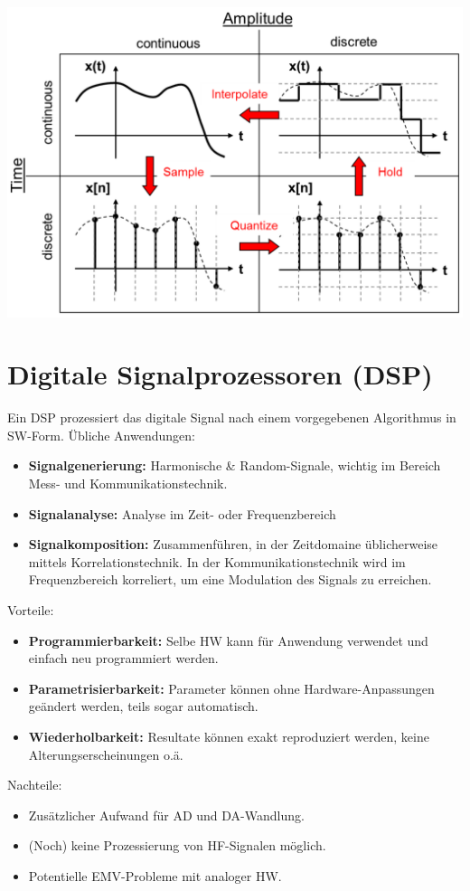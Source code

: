 \begin{center}
	\includegraphics[scale=.85]{../fig/ad_da}
\end{center}
\section{Digitale Signalprozessoren (DSP)}
Ein DSP prozessiert das digitale Signal nach einem vorgegebenen Algorithmus in SW-Form. Übliche Anwendungen:
\begin{itemize}[itemsep=-5pt,topsep=3pt]
	\item \textbf{Signalgenerierung:} Harmonische \& Random-Signale, wichtig im Bereich Mess- und Kommunikationstechnik.
	\item \textbf{Signalanalyse:} Analyse im Zeit- oder Frequenzbereich
	\item \textbf{Signalkomposition:} Zusammenführen, in der Zeitdomaine üblicherweise mittels Korrelationstechnik. In der Kommunikationstechnik wird im Frequenzbereich korreliert, um eine Modulation des Signals zu erreichen. 
\end{itemize}
Vorteile:
\begin{itemize}[itemsep=-5pt,topsep=3pt]
	\item \textbf{Programmierbarkeit:} Selbe HW kann für Anwendung verwendet und einfach neu programmiert werden.
	\item \textbf{Parametrisierbarkeit:} Parameter können ohne Hardware-Anpassungen geändert werden, teils sogar automatisch.
	\item \textbf{Wiederholbarkeit:} Resultate können exakt reproduziert werden, keine Alterungserscheinungen o.ä.
\end{itemize}
Nachteile:
\begin{itemize}[itemsep=-5pt,topsep=3pt]
	\item Zusätzlicher Aufwand für AD und DA-Wandlung.
	\item (Noch) keine Prozessierung von HF-Signalen möglich.
	\item Potentielle EMV-Probleme mit analoger HW.
\end{itemize}
